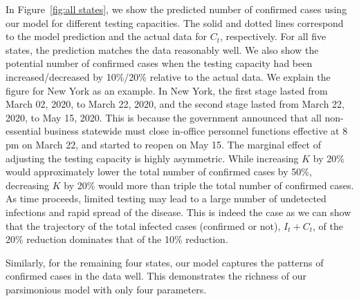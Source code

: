 \documentclass[nonblindrev, copyedit]{informs3a}
\newcommand\nc[1]{\textcolor{red}{NC: #1}}
\begin{document}
In Figure~\ref{fig:all states}, we show the predicted number of confirmed cases  using our model for different testing capacities.
The solid and dotted lines correspond to the model prediction and the actual data for $C_t$, respectively.
For all five states, the prediction matches the data reasonably well.
We also show the potential number of confirmed cases when the testing capacity had been increased/decreased by 10\%/20\% relative to the actual data.
We explain the figure for New York as an example.
In New York, the first stage lasted from March 02, 2020, to March 22, 2020, and the second stage lasted from March 22, 2020, to May 15, 2020.
This is because the government announced that all non-essential business statewide must close in-office personnel functions effective at 8 pm on March 22, and started to reopen on May 15.
The marginal effect of adjusting the testing capacity is highly asymmetric.
While increasing $K$ by 20\% would approximately lower the total number of confirmed cases by 50\%, decreasing $K$ by 20\% would more than triple the total number of confirmed cases.
As time proceeds, limited testing may lead to a large number of undetected infections and rapid spread of the disease.
This is indeed the case as we can show that the trajectory of the total infected cases (confirmed or not), $I_t+C_t$, of the 20\% reduction dominates that of the 10\% reduction.

Similarly, for the remaining four states, our model captures the patterns of confirmed cases in the data well.
This demonstrates the richness of our parsimonious model with only four parameters.
\end{document}

